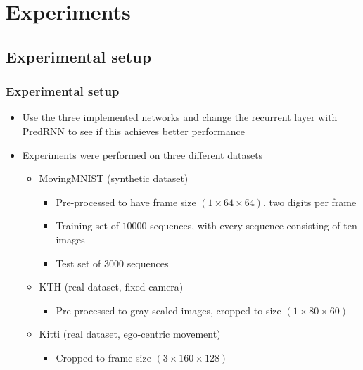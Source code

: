 \section{Experiments} 
 \subsection{Experimental setup}
  \begin{frame}
   \frametitle{Experimental setup}
   
   \begin{itemize}
    \item<1-> Use the three implemented networks and change the recurrent layer with PredRNN to see if this achieves better performance
    \item<2-> Experiments were performed on three different datasets
    \begin{itemize}
     \item<3-> MovingMNIST (synthetic dataset)
     \begin{itemize}
      \item<4-> Pre-processed to have frame size $(1 \times 64 \times 64)$, two digits per frame
      \item<5-> Training set of $10000$ sequences, with every sequence consisting of ten images
      \item<6-> Test set of $3000$ sequences
     \end{itemize}
     \item<7-> KTH (real dataset, fixed camera)
     \begin{itemize}
      \item<8-> Pre-processed to gray-scaled images, cropped to size $(1 \times 80 \times 60)$
     \end{itemize}
     \item<9-> Kitti (real dataset, ego-centric movement)
     \begin{itemize}
      \item<10-> Cropped to frame size $(3 \times 160 \times 128)$
     \end{itemize}
    \end{itemize}
   \end{itemize}

  \end{frame}
